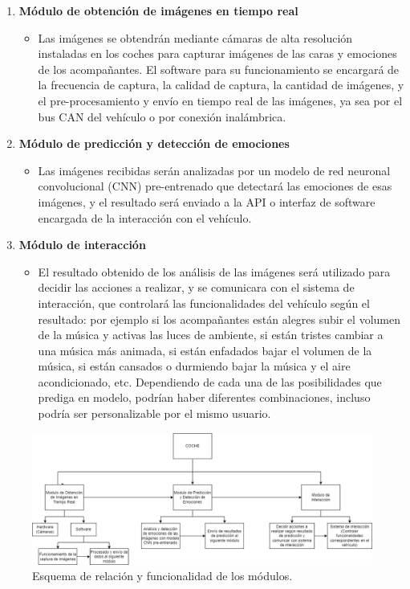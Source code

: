 \documentclass[12pt]{report} %
\begin{document}
\begin{enumerate}

    \item \textbf{Módulo de obtención de imágenes en tiempo real}
    \begin{itemize}
		\item Las imágenes se obtendrán mediante cámaras de alta resolución instaladas en los coches para capturar imágenes de las caras  y emociones de los acompañantes. El software para su funcionamiento se encargará de la frecuencia de captura, la calidad de captura, la cantidad de imágenes, y el pre-procesamiento y envío en tiempo real de las imágenes, ya sea por el bus CAN del vehículo o por conexión inalámbrica.
	\end{itemize}

    \item \textbf{Módulo de predicción y detección de emociones}
    \begin{itemize}
		\item Las imágenes recibidas serán analizadas por un modelo de red neuronal convolucional (CNN) pre-entrenado que detectará las emociones de esas imágenes, y el resultado será enviado a la API o interfaz de software encargada de la interacción con el vehículo. 
	\end{itemize}
    
    \item \textbf{Módulo de interacción}
    \begin{itemize}
		\item El resultado obtenido de los análisis de las imágenes será utilizado para decidir las acciones a realizar, y se comunicara con el sistema de interacción, que controlará las funcionalidades del vehículo según el resultado: por ejemplo si los acompañantes están alegres subir el volumen de la música y activas las luces de ambiente, si están tristes cambiar a una música más animada, si están enfadados bajar el volumen de la música, si están cansados o durmiendo bajar la música y el aire acondicionado, etc. Dependiendo de cada una de las posibilidades que prediga en modelo, podrían haber diferentes combinaciones, incluso podría ser personalizable por el mismo usuario.
	\end{itemize}

\end{enumerate}

\begin{figure}[H]
	\centering
	\includegraphics[width=\textwidth]{diagramaModulos.png}
	\caption{Esquema de relación y funcionalidad de los módulos.}
	\label{fig:imagen33}
\end{figure}
\end{document}
